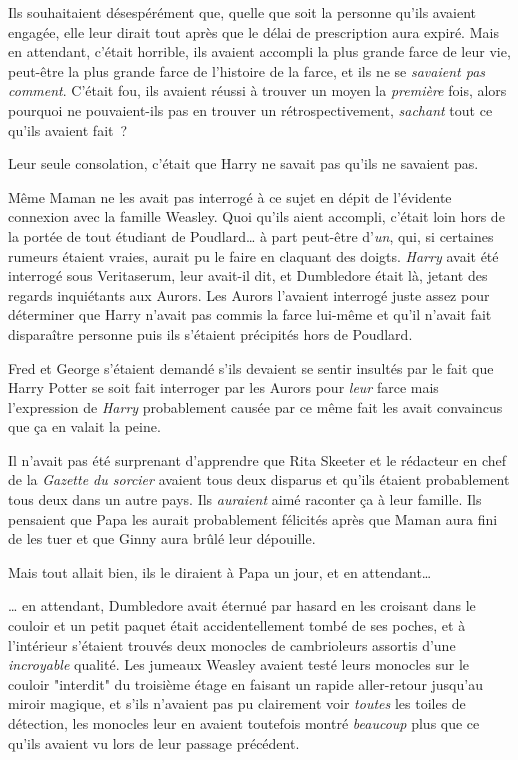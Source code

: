 Ils souhaitaient désespérément que, quelle que soit la personne qu'ils avaient engagée, elle leur dirait tout après que le délai de prescription aura expiré. Mais en attendant, c'était horrible, ils avaient accompli la plus grande farce de leur vie, peut-être la plus grande farce de l'histoire de la farce, et ils ne se \emph{savaient pas comment}. C'était fou, ils avaient réussi à trouver un moyen la \emph{première} fois, alors pourquoi ne pouvaient-ils pas en trouver un rétrospectivement, \emph{sachant} tout ce qu'ils avaient fait~?

Leur seule consolation, c'était que Harry ne savait pas qu'ils ne savaient pas.

Même Maman ne les avait pas interrogé à ce sujet en dépit de l'évidente connexion avec la famille Weasley. Quoi qu'ils aient accompli, c'était loin hors de la portée de tout étudiant de Poudlard… à part peut-être d'\emph{un}, qui, si certaines rumeurs étaient vraies, aurait pu le faire en claquant des doigts. \emph{Harry} avait été interrogé sous Veritaserum, leur avait-il dit, et Dumbledore était là, jetant des regards inquiétants aux Aurors. Les Aurors l'avaient interrogé juste assez pour déterminer que Harry n'avait pas commis la farce lui-même et qu'il n'avait fait disparaître personne puis ils s'étaient précipités hors de Poudlard.

Fred et George s'étaient demandé s'ils devaient se sentir insultés par le fait que Harry Potter se soit fait interroger par les Aurors pour \emph{leur} farce mais l'expression de \emph{Harry} probablement causée par ce même fait les avait convaincus que ça en valait la peine.

Il n'avait pas été surprenant d'apprendre que Rita Skeeter et le rédacteur en chef de la \emph{Gazette du sorcier} avaient tous deux disparus et qu'ils étaient probablement tous deux dans un autre pays. Ils \emph{auraient} aimé raconter ça à leur famille. Ils pensaient que Papa les aurait probablement félicités après que Maman aura fini de les tuer et que Ginny aura brûlé leur dépouille.

Mais tout allait bien, ils le diraient à Papa un jour, et en attendant…

… en attendant, Dumbledore avait éternué par hasard en les croisant dans le couloir et un petit paquet était accidentellement tombé de ses poches, et à l'intérieur s'étaient trouvés deux monocles de cambrioleurs assortis d'une \emph{incroyable} qualité. Les jumeaux Weasley avaient testé leurs monocles sur le couloir "interdit" du troisième étage en faisant un rapide aller-retour jusqu'au miroir magique, et s'ils n'avaient pas pu clairement voir \emph{toutes} les toiles de détection, les monocles leur en avaient toutefois montré \emph{beaucoup} plus que ce qu'ils avaient vu lors de leur passage précédent.

